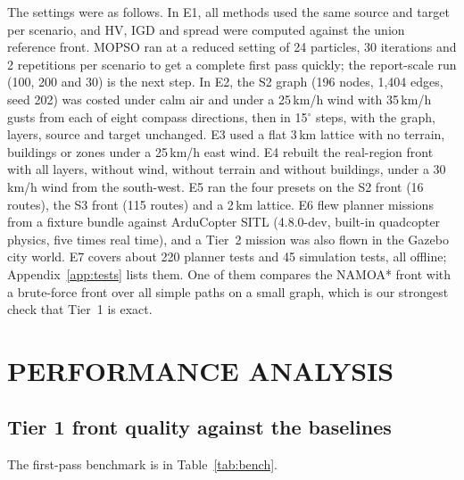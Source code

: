 The settings were as follows. In E1, all methods used the same source and target per
scenario, and HV, IGD and spread were computed against the union reference front. MOPSO
ran at a reduced setting of 24 particles, 30 iterations and 2 repetitions per scenario
to get a complete first pass quickly; the report-scale run (100, 200 and 30) is the next
step. In E2, the S2 graph (196 nodes, 1,404 edges, seed 202) was costed under calm air
and under a 25\,km/h wind with 35\,km/h gusts from each of eight compass directions, then
in 15$^\circ$ steps, with the graph, layers, source and target unchanged. E3 used a flat
3\,km lattice with no terrain, buildings or zones under a 25\,km/h east wind. E4 rebuilt
the real-region front with all layers, without wind, without terrain and without
buildings, under a 30\,km/h wind from the south-west. E5 ran the four presets on the S2
front (16 routes), the S3 front (115 routes) and a 2\,km lattice. E6 flew planner
missions from a fixture bundle against ArduCopter SITL (4.8.0-dev, built-in quadcopter
physics, five times real time), and a Tier~2 mission was also flown in the Gazebo city
world. E7 covers about 220 planner tests and 45 simulation tests, all offline;
Appendix~\ref{app:tests} lists them. One of them compares the NAMOA* front with a
brute-force front over all simple paths on a small graph, which is our strongest check
that Tier~1 is exact.

\section{PERFORMANCE ANALYSIS}\label{sec:performance}

\subsection{Tier 1 front quality against the baselines}\label{sec:perf-front}

The first-pass benchmark is in Table~\ref{tab:bench}.

